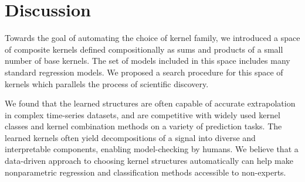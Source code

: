 %
%
%









\section{Discussion}


%



Towards the goal of automating the choice of kernel family, we introduced a space of composite kernels defined compositionally as sums and products of a small number of base kernels.  
The set of models included in this space includes many standard regression models.
We proposed a search procedure for this space of kernels which parallels the process of scientific discovery.

We found that the learned structures are often capable of accurate extrapolation in complex time-series datasets, and are competitive with widely used kernel classes and kernel combination methods on a variety of prediction tasks.
The learned kernels often yield decompositions of a signal into diverse and interpretable components, enabling model-checking by humans.  %
We believe that a data-driven approach to choosing kernel structures automatically can help make nonparametric regression and classification methods accessible to non-experts.


